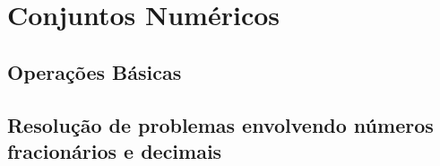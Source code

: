 \chapter{Conjuntos Numéricos}
\section{Operações Básicas}
\section{Resolução de problemas envolvendo números fracionários e decimais}